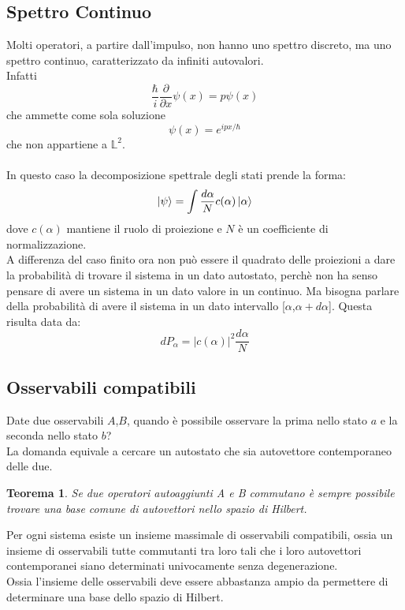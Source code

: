 \documentclass[twoside]{article}
\newtheorem{theorem}{Teorema}[section]
\begin{document}
\subsection{Spettro Continuo}
Molti operatori, a partire dall'impulso, non hanno uno spettro discreto, ma uno spettro continuo, caratterizzato da infiniti autovalori.
\\
Infatti
\begin{equation}
    \frac{\hbar}{i}\frac{\partial}{\partial x}\psi(x)=p\psi(x) 
\end{equation}
che ammette come sola soluzione
\begin{equation}
    \psi(x)= e^{ipx/\hbar}
\end{equation}
che non appartiene a $\mathds{L}^2$.
\\
\\
In questo caso la decomposizione spettrale degli stati prende la forma:
\begin{equation}
    \ket{\psi}=\int{\frac{d\alpha}{N}c(\alpha)\ket{\alpha}}
\end{equation}
dove $c(\alpha)$ mantiene il ruolo di proiezione e $N$ è un coefficiente di normalizzazione.
\\
A differenza del caso finito ora non può essere il quadrato delle proiezioni a dare la probabilità di trovare il sistema in un dato autostato, perchè non ha senso pensare di avere un sistema in un dato valore in un continuo. Ma bisogna parlare della probabilità di avere il sistema in un dato intervallo [$\alpha$,$\alpha+d\alpha$]. Questa risulta data da:
\begin{equation}
    dP_{\alpha}=|c(\alpha)|^2 \frac{d\alpha}{N}
\end{equation}

\vspace{0.5cm}

\subsection{Osservabili compatibili}
Date due osservabili $A$,$B$, quando è possibile osservare la prima nello stato $a$ e la seconda nello stato $b$?
\\
La domanda equivale a cercare un autostato che sia autovettore contemporaneo delle due.

\begin{theorem}Se due operatori autoaggiunti A e B commutano è sempre possibile trovare una base comune di
autovettori nello spazio di Hilbert.
\end{theorem}
Per ogni sistema esiste un insieme massimale di osservabili compatibili, ossia un insieme di osservabili tutte commutanti tra loro tali che i loro autovettori contemporanei siano determinati univocamente senza degenerazione.
\\
Ossia l'insieme delle osservabili deve essere abbastanza ampio da permettere di determinare una base dello spazio di Hilbert.
\end{document}
